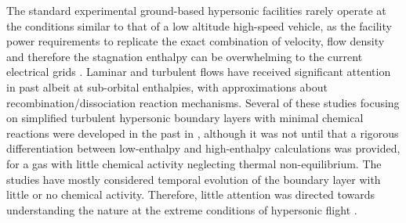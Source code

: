 The standard experimental ground-based hypersonic facilities rarely operate at the conditions similar to that of a low altitude high-speed vehicle, as the facility power requirements to replicate the exact combination of velocity, flow density and therefore the stagnation enthalpy can be overwhelming to the current electrical grids \citep{passiatore2022}. Laminar and turbulent flows have received significant attention in past albeit at sub-orbital enthalpies, with approximations about recombination/dissociation reaction mechanisms. Several of these studies focusing on simplified turbulent hypersonic boundary layers with minimal chemical reactions were developed in the past in \cite{martin1998} , although it was not until \cite{duanmartin2011} that a rigorous differentiation between low-enthalpy and high-enthalpy calculations was provided, for a gas with little chemical activity neglecting thermal non-equilibrium. The studies have mostly considered temporal evolution of the boundary layer with little or no chemical activity. Therefore, little attention was directed towards understanding the nature at the extreme conditions of hypersonic flight \citep{Candler2019}.


